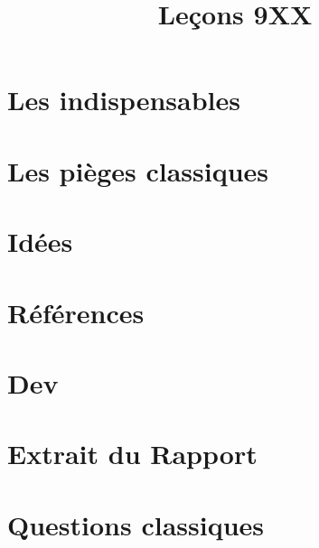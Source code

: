\documentclass{article}
\title{Leçons 9XX}
\begin{document}
\maketitle

\section{Les indispensables}

\section{Les pièges classiques}

\section{Idées}

\section{Références}

\begin{itemize}

\end{itemize}

\section{Dev}
\begin{itemize}

\end{itemize}

\section{Extrait du Rapport}

\section{Questions classiques}
\end{document}
